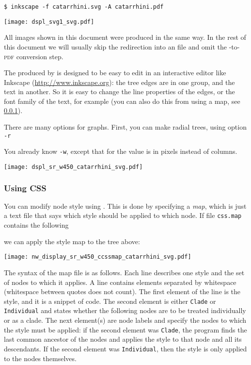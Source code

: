 \begin{verbatim}
$ inkscape -f catarrhini.svg -A catarrhini.pdf
\end{verbatim}

\begin{center}
 \texttt{[image: dspl\_svg1\_svg.pdf]}
\end{center}
All \svg{} images shown in this document were produced in the same way. In the
rest of this document we will usually skip the redirection into an \svg{} file
and omit the \svg{}-to-\textsc{pdf} conversion step.

The \svg{} produced by \display{} is designed to be easy to edit
in an interactive editor like Inkscape (\url{http://www.inkscape.org}): the
tree edges are in one group, and the text in another. So it is easy to change
the line properties of the edges, or the font family of the text, for example
(you can also do this from \display{} using a \css{} map, see
\ref{sct_display_svg_css}).

There are many options for \svg{} graphs. First, you can make radial trees,
using option \texttt{-r} 

You already know \texttt{-w}, except that for \svg{} the value is in pixels instead of columns. 

\begin{center}
\texttt{[image: dspl\_sr\_w450\_catarrhini\_svg.pdf]}
\end{center}

\subsubsection{Using CSS}
\label{sct_display_svg_css}

You can modify node style using \css. This is done by specifying a
\textit{\css{} map}, which is just a text file that says which style should be
applied to which node. If file \texttt{css.map} contains the following
\begin{quote}  \end{quote} we can apply the style map to
the tree above:



\begin{center}
 \texttt{[image: nw\_display\_sr\_w450\_ccssmap\_catarrhini\_svg.pdf]}
\end{center}

The syntax of the \css{} map file is as follows. Each line describes one style
and the set of nodes to which it applies. A line contains elements separated by
whitespace (whitespace between quotes does not count). The first element of the
line is the style, and it is a snippet of \css{} code. The second element is
either \texttt{Clade} or \texttt{Individual} and states whether the following
nodes are to be treated individually or as a clade. The next element(s) are
node labels and specify the nodes to which the style must be applied: if the
second element was \texttt{Clade}, the program finds the last common ancestor
of the nodes and applies the style to that node and all its descendants. If the
second element was \texttt{Individual}, then the style is only applied to the
nodes themselves.

